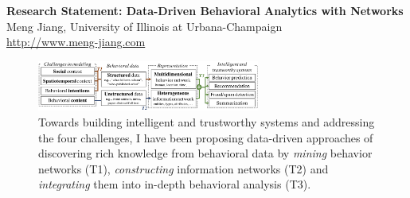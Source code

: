 \documentclass[10.5pt]{article}
\begin{document}


\begin{center}
{\Large \bf Research Statement: Data-Driven Behavioral Analytics with Networks} \\
\vskip 0.05in
{\large Meng Jiang, University of Illinois at Urbana-Champaign} \\
{\url{http://www.meng-jiang.com}}
\vskip -0.20in
\end{center}

\begin{figure}
\vskip -0.18in
\includegraphics[width=0.65\textwidth]{figure/intro.pdf}
\vskip -0.18in
\caption{Towards building intelligent and trustworthy systems and addressing the four challenges, I have been proposing data-driven approaches of discovering rich knowledge from behavioral data by \textit{mining} behavior networks (T1), \textit{constructing} information networks (T2) and \textit{integrating} them into in-depth behavioral analysis (T3).}
\label{fig:intro}
\vskip -0.12in
\end{figure}
\end{document}
